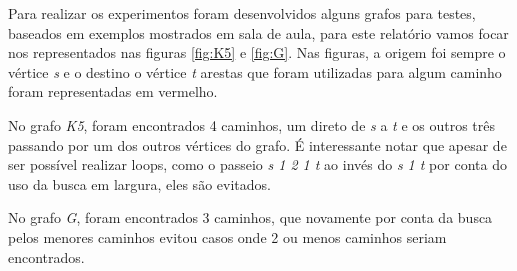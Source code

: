 Para realizar os experimentos foram desenvolvidos alguns grafos para testes, baseados em exemplos mostrados em sala de aula, para este relatório vamos focar nos representados nas figuras \ref{fig:K5} e \ref{fig:G}. Nas figuras, a origem foi sempre o vértice \textit{s} e o destino o vértice \textit{t} arestas que foram utilizadas para algum caminho foram representadas em vermelho.

No grafo \textit{K5}, foram encontrados 4 caminhos, um direto de \textit{s} a \textit{t} e os outros três passando por um dos outros vértices do grafo. É interessante notar que apesar de ser possível realizar loops, como o passeio \textit{s 1 2 1 t} ao invés do \textit{s 1 t} por conta do uso da busca em largura, eles são evitados.

No grafo \textit{G}, foram encontrados 3 caminhos, que novamente por conta da busca pelos menores caminhos evitou casos onde 2 ou menos caminhos seriam encontrados.

